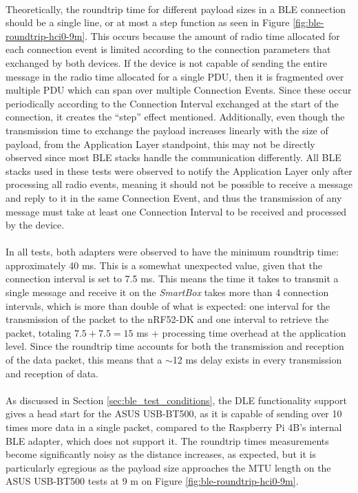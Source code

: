 \paragraph{} Theoretically, the roundtrip time for different payload sizes in a \acs{BLE} connection should be a single line, or at most a step function as seen in Figure \ref{fig:ble-roundtrip-hci0-9m}. This occurs because the amount of radio time allocated for each connection event is limited according to the connection parameters that exchanged by both devices. If the device is not capable of sending the entire message in the radio time allocated for a single \acs{PDU}, then it is fragmented over multiple \acs{PDU} which can span over multiple Connection Events. Since these occur periodically according to the Connection Interval exchanged at the start of the connection, it creates the ``step'' effect mentioned. Additionally, even though the transmission time to exchange the payload increases linearly with the size of payload, from the Application Layer standpoint, this may not be directly observed since most \acs{BLE} stacks handle the communication differently. All \acs{BLE} stacks used in these tests were observed to notify the Application Layer only after processing all radio events, meaning it should not be possible to receive a message and reply to it in the same Connection Event, and thus the transmission of any message must take at least one Connection Interval to be received and processed by the device.

\paragraph{} In all tests, both adapters were observed to have the minimum roundtrip time: approximately 40 ms. This is a somewhat unexpected value, given that the connection interval is set to 7.5 ms. This means the time it takes to transmit a single message and receive it on the \textit{SmartBox} takes more than 4 connection intervals, which is more than double of what is expected: one interval for the transmission of the packet to the nRF52-DK and one interval to retrieve the packet, totaling $7.5+7.5=15$ ms + processing time overhead at the application level. Since the roundtrip time accounts for both the transmission and reception of the data packet, this means that a $\sim$12 ms delay exists in every transmission and reception of data.

\paragraph{} As discussed in Section \ref{sec:ble_test_conditions}, the \acs{DLE} functionality support gives a head start for the ASUS USB-BT500, as it is capable of sending over 10 times more data in a single packet, compared to the Raspberry Pi 4B's internal \acs{BLE} adapter, which does not support it. The roundtrip times measurements become significantly noisy as the distance increases, as expected, but it is particularly egregious as the payload size approaches the \acs{MTU} length on the ASUS USB-BT500 tests at 9 m on Figure \ref{fig:ble-roundtrip-hci0-9m}.

